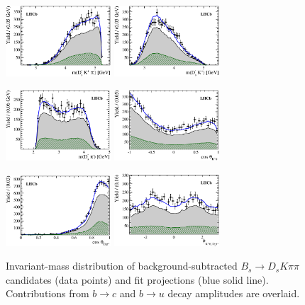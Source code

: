 \begin{figure}[h]
		\includegraphics[width=0.35\textwidth, height = !]{figs/fullFit/signal_new/m_DsKpi_mod.eps} 
		\includegraphics[width=0.35\textwidth, height = !]{figs/fullFit/signal_new/m_DsK_mod.eps} 
		
		\includegraphics[width=0.35\textwidth, height = !]{figs/fullFit/signal_new/m_Dspim_mod.eps} 
		\includegraphics[width=0.35\textwidth, height = !]{figs/fullFit/signal_new/h_cosTheta_Kpi_mod.eps} 
		
		\includegraphics[width=0.35\textwidth, height = !]{figs/fullFit/signal_new/h_cosTheta_Dspi_mod.eps} 
		\includegraphics[width=0.35\textwidth, height = !]{figs/fullFit/signal_new/h_phi_Kpi_Dspi_mod.eps} 
		
		\caption{
		Invariant-mass distribution of background-subtracted $B_s\to D_s K \pi \pi$ candidates (data points) and fit projections (blue solid line).
			Contributions from $b\to c$ and $b\to u$ decay amplitudes are overlaid.
		} 		
		  \label{fig:fullFit}
\end{figure}


